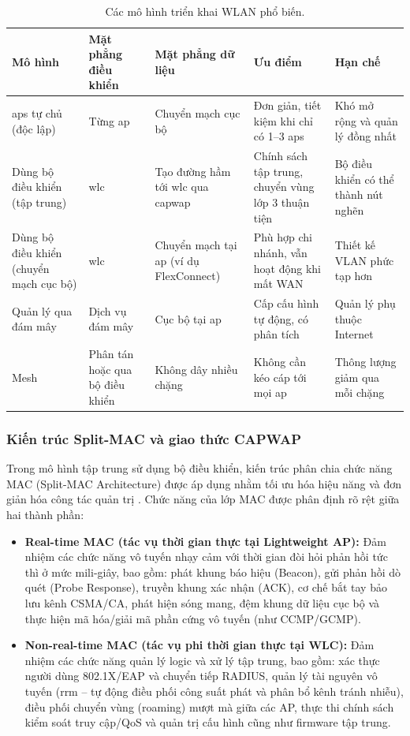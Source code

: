 \begin{table}[htbp]
  \centering\footnotesize
  \caption{Các mô hình triển khai WLAN phổ biến.}
  \label{tab:deployment-models}
  \begin{tabularx}{\linewidth}{@{} L{0.8} L{0.8} L{0.8} L{1.3} L{1.3} @{}}
    \toprule
    \textbf{Mô hình} & \textbf{Mặt phẳng điều khiển} & \textbf{Mặt phẳng dữ liệu} & \textbf{Ưu điểm} & \textbf{Hạn chế} \\
    \midrule
    \acp{ap} tự chủ (độc lập) & Từng \ac{ap} & Chuyển mạch cục bộ & Đơn giản, tiết kiệm khi chỉ có 1--3 \acp{ap} & Khó mở rộng và quản lý đồng nhất \\
    Dùng bộ điều khiển (tập trung) & \acs{wlc} & Tạo đường hầm tới \acs{wlc} qua \acs{capwap} & Chính sách tập trung, chuyển vùng lớp 3 thuận tiện & Bộ điều khiển có thể thành nút nghẽn \\
    Dùng bộ điều khiển (chuyển mạch cục bộ) & \acs{wlc} & Chuyển mạch tại \ac{ap} (ví dụ FlexConnect) & Phù hợp chi nhánh, vẫn hoạt động khi mất WAN & Thiết kế VLAN phức tạp hơn \\
    Quản lý qua đám mây & Dịch vụ đám mây & Cục bộ tại \ac{ap} & Cấp cấu hình tự động, có phân tích & Quản lý phụ thuộc Internet \\
    Mesh & Phân tán hoặc qua bộ điều khiển & Không dây nhiều chặng & Không cần kéo cáp tới mọi \ac{ap} & Thông lượng giảm qua mỗi chặng \\
    \bottomrule
  \end{tabularx}
\end{table}

\subsubsection{Kiến trúc Split-MAC và giao thức CAPWAP}

Trong mô hình tập trung sử dụng bộ điều khiển, kiến trúc phân chia chức năng MAC (Split-MAC Architecture) được áp dụng nhằm tối ưu hóa hiệu năng và đơn giản hóa công tác quản trị \cite{coleman2021, rfc5416}. Chức năng của lớp MAC được phân định rõ rệt giữa hai thành phần:
\begin{itemize}
  \item \textbf{Real-time MAC (tác vụ thời gian thực tại Lightweight AP):} Đảm nhiệm các chức năng vô tuyến nhạy cảm với thời gian đòi hỏi phản hồi tức thì ở mức mili-giây, bao gồm: phát khung báo hiệu (Beacon), gửi phản hồi dò quét (Probe Response), truyền khung xác nhận (ACK), cơ chế bắt tay bảo lưu kênh CSMA/CA, phát hiện sóng mang, đệm khung dữ liệu cục bộ và thực hiện mã hóa/giải mã phần cứng vô tuyến (như CCMP/GCMP).
  \item \textbf{Non-real-time MAC (tác vụ phi thời gian thực tại WLC):} Đảm nhiệm các chức năng quản lý logic và xử lý tập trung, bao gồm: xác thực người dùng 802.1X/EAP và chuyển tiếp RADIUS, quản lý tài nguyên vô tuyến (\ac{rrm} -- tự động điều phối công suất phát và phân bổ kênh tránh nhiễu), điều phối chuyển vùng (roaming) mượt mà giữa các AP, thực thi chính sách kiểm soát truy cập/QoS và quản trị cấu hình cũng như firmware tập trung.
\end{itemize}

